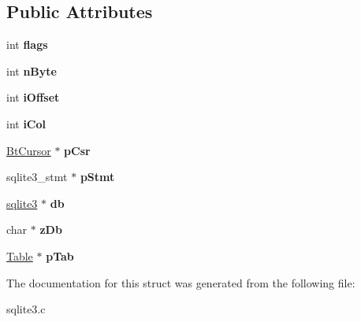 \subsection*{Public Attributes}
\begin{DoxyCompactItemize}
\item 
int {\bfseries flags}\hypertarget{structIncrblob_a46fa093e5241305f28d02926f8d0846f}{}\label{structIncrblob_a46fa093e5241305f28d02926f8d0846f}

\item 
int {\bfseries n\+Byte}\hypertarget{structIncrblob_ab1e1439df086208173fa97003f0ee02b}{}\label{structIncrblob_ab1e1439df086208173fa97003f0ee02b}

\item 
int {\bfseries i\+Offset}\hypertarget{structIncrblob_af8e71744f43178967460b9f402e7fafd}{}\label{structIncrblob_af8e71744f43178967460b9f402e7fafd}

\item 
int {\bfseries i\+Col}\hypertarget{structIncrblob_a398a322b061fb9952bc155026976ba51}{}\label{structIncrblob_a398a322b061fb9952bc155026976ba51}

\item 
\hyperlink{structBtCursor}{Bt\+Cursor} $\ast$ {\bfseries p\+Csr}\hypertarget{structIncrblob_af5a24b18473d1449c8c3fe7d826de59a}{}\label{structIncrblob_af5a24b18473d1449c8c3fe7d826de59a}

\item 
sqlite3\+\_\+stmt $\ast$ {\bfseries p\+Stmt}\hypertarget{structIncrblob_a8b7b39c9372db552add74c69f14a61a3}{}\label{structIncrblob_a8b7b39c9372db552add74c69f14a61a3}

\item 
\hyperlink{structsqlite3}{sqlite3} $\ast$ {\bfseries db}\hypertarget{structIncrblob_a9d3fe0b0229b75b9d0f9ee8e6545b5bc}{}\label{structIncrblob_a9d3fe0b0229b75b9d0f9ee8e6545b5bc}

\item 
char $\ast$ {\bfseries z\+Db}\hypertarget{structIncrblob_a908d355a5ea919ea43b0f8377b1d27de}{}\label{structIncrblob_a908d355a5ea919ea43b0f8377b1d27de}

\item 
\hyperlink{structTable}{Table} $\ast$ {\bfseries p\+Tab}\hypertarget{structIncrblob_a8e8527f370fa5798363ab789f5abe549}{}\label{structIncrblob_a8e8527f370fa5798363ab789f5abe549}

\end{DoxyCompactItemize}


The documentation for this struct was generated from the following file\+:\begin{DoxyCompactItemize}
\item 
sqlite3.\+c\end{DoxyCompactItemize}
